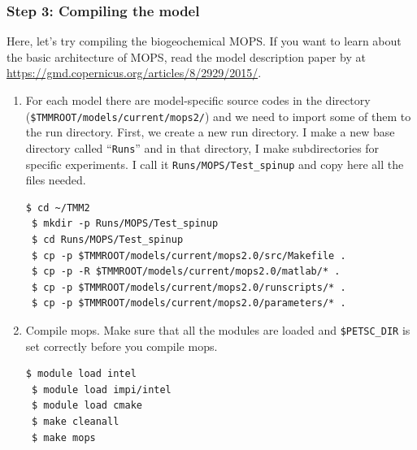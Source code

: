 \documentclass[a4paper]{article}
\def\noin{\noindent }
\begin{document}
\subsubsection{Step 3: Compiling the model}
\noin Here, let's try compiling the biogeochemical MOPS. If you want to learn about the basic architecture of MOPS, read the model description paper by \citet{Kriest15} at \url{https://gmd.copernicus.org/articles/8/2929/2015/}. 

\begin{enumerate}
\item For each model there are model-specific source codes in the directory (\verb|$TMMROOT/models/current/mops2/|) and we need to import some of them to the run directory. First, we create a new run directory. I make a new base directory called ``\verb|Runs|'' and in that directory, I make subdirectories for specific experiments. I call it \verb|Runs/MOPS/Test_spinup| and copy here all the files needed.

\begin{lstlisting}[style=DOS]
 $ cd ~/TMM2
 $ mkdir -p Runs/MOPS/Test_spinup
 $ cd Runs/MOPS/Test_spinup
 $ cp -p $TMMROOT/models/current/mops2.0/src/Makefile .
 $ cp -p -R $TMMROOT/models/current/mops2.0/matlab/* .
 $ cp -p $TMMROOT/models/current/mops2.0/runscripts/* .
 $ cp -p $TMMROOT/models/current/mops2.0/parameters/* .
\end{lstlisting}

\item Compile mops. Make sure that all the modules are loaded and \verb|$PETSC_DIR| is set correctly before you compile mops.
\begin{lstlisting}[style=DOS]
 $ module load intel
 $ module load impi/intel
 $ module load cmake
 $ make cleanall
 $ make mops
\end{lstlisting}


\end{enumerate}
\end{document}
